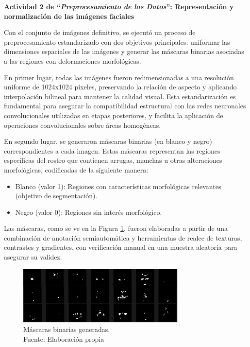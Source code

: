 \textbf{Actividad 2 de “\textit{Preprocesamiento de los Datos}”: Representación y normalización de las imágenes faciales}

Con el conjunto de imágenes definitivo, se ejecutó un proceso de preprocesamiento estandarizado con dos objetivos principales: uniformar las dimensiones espaciales de las imágenes y generar las máscaras binarias asociadas a las regiones con deformaciones morfológicas.

En primer lugar, todas las imágenes fueron redimensionadas a una resolución uniforme de 1024x1024 píxeles, preservando la relación de aspecto y aplicando interpolación bilineal para mantener la calidad visual. Esta estandarización es fundamental para asegurar la compatibilidad estructural con las redes neuronales convolucionales utilizadas en etapas posteriores, y facilita la aplicación de operaciones convolucionales sobre áreas homogéneas.

En segundo lugar, se generaron máscaras binarias (en blanco y negro) correspondientes a cada imagen. Estas máscaras representan las regiones específicas del rostro que contienen arrugas, manchas u otras alteraciones morfológicas, codificadas de la siguiente manera:

\begin{itemize}
    \item Blanco (valor 1): Regiones con características morfológicas relevantes (objetivo de segmentación).   
    \item Negro (valor 0): Regiones sin interés morfológico.
\end{itemize} 

Las máscaras, como se ve en la Figura \ref{4:fig2}, fueron elaboradas a partir de una combinación de anotación semiautomática y herramientas de realce de texturas, contrastes y gradientes, con verificación manual en una muestra aleatoria para asegurar su validez.

\begin{figure}[h]
	\begin{center}
		\includegraphics[width=0.75\textwidth]{4/figures/mascaras.png}
		\caption[Máscaras binarias generadas]{Máscaras binarias generadas.\\
		Fuente: Elaboración propia}
		\label{4:fig2}
	\end{center}
\end{figure}

